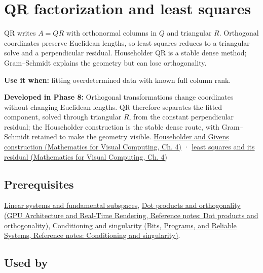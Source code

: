 \hypertarget{appendix-c3421e6b4f2c}{}\label{referencestart:appendix-c3421e6b4f2c}
\section{QR factorization and least squares}\label{appendix-c3421e6b4f2c-qr-factorization-and-least-squares}

QR writes \(A=QR\) with orthonormal columns in \(Q\) and triangular \(R\). Orthogonal coordinates preserve Euclidean lengths, so least squares reduces to a triangular solve and a perpendicular residual. Householder QR is a stable dense method; Gram--Schmidt explains the geometry but can lose orthogonality.

\textbf{Use it when:} fitting overdetermined data with known full column rank.

\textbf{Developed in Phase 8:} Orthogonal transformations change coordinates without changing Euclidean lengths. QR therefore separates the fitted component, solved through triangular \(R\), from the constant perpendicular residual; the Householder construction is the stable dense route, with Gram--Schmidt retained to make the geometry visible. \href{../02-Mathematics-for-Visual-Computing/main.pdf\#nameddest=01-foundations-i-ch020-reflections-and-plane-rotations-build-qr-without-losing-lengths}{Householder and Givens construction (Mathematics for Visual Computing, Ch. 4)} · \href{../02-Mathematics-for-Visual-Computing/main.pdf\#nameddest=01-foundations-i-ch020-qr-turns-least-squares-into-a-triangular-solve-plus-an-irreducible-residual}{least squares and its residual (Mathematics for Visual Computing, Ch. 4)}

\subsection{Prerequisites}\label{appendix-c3421e6b4f2c-prerequisites}

\hyperref[appendix-8572a4a060c1]{Linear systems and fundamental subspaces}, \href{../06-GPU-Architecture-and-Real-Time-Rendering/main.pdf\#nameddest=appendix-8bc4e8fc547c}{Dot products and orthogonality (GPU Architecture and Real-Time Rendering, Reference notes: Dot products and orthogonality)}, \href{../01-Bits-Programs-and-Reliable-Systems/main.pdf\#nameddest=appendix-8f6a01f284a7}{Conditioning and singularity (Bits, Programs, and Reliable Systems, Reference notes: Conditioning and singularity)}.

\subsection{Used by}\label{appendix-c3421e6b4f2c-used-by}

